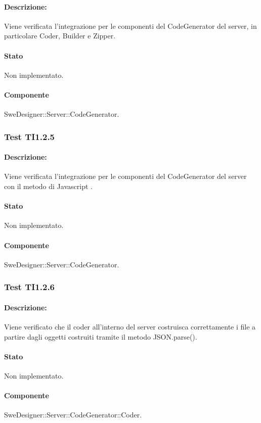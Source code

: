 \documentclass[../PianoDiQualifica.tex]{subfiles}
\begin{document}
	\paragraph{Descrizione:} Viene verificata l'integrazione per le componenti del CodeGenerator del server, in particolare Coder, Builder e Zipper.
	\paragraph{Stato} Non implementato.
	\paragraph{Componente} SweDesigner::Server::CodeGenerator.
	
	\subsubsection{Test TI1.2.5}
	\paragraph{Descrizione:} Viene verificata l'integrazione per le componenti del CodeGenerator del server con il metodo di Javascript . %
	\paragraph{Stato} Non implementato.
	\paragraph{Componente} SweDesigner::Server::CodeGenerator.
	
	\subsubsection{Test TI1.2.6}
	\paragraph{Descrizione:} Viene verificato che il coder all'interno del server costruisca correttamente i file a partire dagli oggetti costruiti tramite il metodo JSON.parse().
	\paragraph{Stato} Non implementato.
	\paragraph{Componente} SweDesigner::Server::CodeGenerator::Coder.
\end{document}
